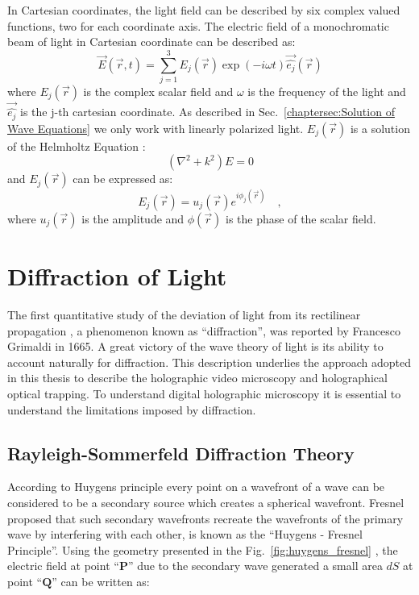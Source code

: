In Cartesian coordinates, the light field can be described by six complex valued functions, two for each coordinate axis. The electric field of a monochromatic beam of light in Cartesian coordinate can be described as:
\begin{equation}
\label{eq:complexfield}
\vec{E}(\vec{r},t) = {\displaystyle\sum_{j=1}^{3}}E_j\left(\vec{r}\right)
							\exp \left(-i\omega t\right)\vec{\hat{e_j}}(\vec{r})
\end{equation}
where $E_j(\vec{r})$ is the complex scalar field and $\omega$ is the frequency of the light and $\vec{\hat{e_j}}$ is the j-th cartesian coordinate. As described in Sec.~\ref{chaptersec:Solution of Wave Equations} we only work with linearly polarized light. $E_j(\vec{r})$ is a solution of the Helmholtz Equation \cite{goodmanfourier}:
\begin{equation}
\left(\nabla ^2 + k^2\right) E = 0
\end{equation}
and $E_j(\vec{r})$ can be expressed as:
\begin{equation}
\label{eq:E_amp_phase}
E_j \left(\vec{r}\right) = u_j\left(\vec{r}\right) e^{i\phi _j (\vec{r})}\quad ,
\end{equation}
where $u_j(\vec{r})$ is the amplitude and $\phi (\vec{r})$ is the phase of the scalar field.
  


\section{Diffraction of Light}

The first quantitative study of the deviation of light from its rectilinear propagation \cite{hechtoptics}, a phenomenon known as ``diffraction'', was reported by Francesco Grimaldi \cite{bornwolf} in 1665. A great victory of the wave theory of light is its ability to account naturally for diffraction. This description underlies the approach adopted in this thesis to describe the holographic video microscopy and holographical optical trapping. To understand digital holographic microscopy \cite{Lee:07} it is essential to understand the limitations imposed by diffraction.

\subsection{Rayleigh-Sommerfeld Diffraction Theory}
According to Huygens principle every point on a wavefront of a wave can be considered to be a secondary source which creates a spherical wavefront. Fresnel proposed that such secondary wavefronts recreate the wavefronts of the primary wave by interfering with each other, is known as the ``Huygens - Fresnel Principle''. Using the geometry presented in the Fig.~\ref{fig:huygens_fresnel} , the electric field at point ``$\mathbf{P}$'' due to the secondary wave generated a small area $dS$ at point ``$\mathbf{Q}$'' can be written as:

